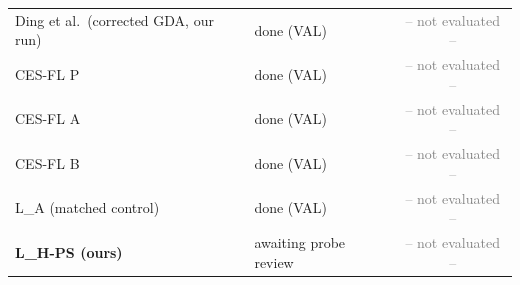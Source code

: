 \documentclass[9pt]{extarticle}
\begin{document}
\begin{table}[h]
{\begin{tabular}{ll|ccccc|ccccc|ccccc|ccccc}
Ding et al.\ (corrected GDA, our run) & done (VAL) & \multicolumn{20}{c}{\textcolor{gray}{-- not evaluated --}} \\
CES-FL P & done (VAL) & \multicolumn{20}{c}{\textcolor{gray}{-- not evaluated --}} \\
CES-FL A & done (VAL) & \multicolumn{20}{c}{\textcolor{gray}{-- not evaluated --}} \\
CES-FL B & done (VAL) & \multicolumn{20}{c}{\textcolor{gray}{-- not evaluated --}} \\
L\_A (matched control) & done (VAL) & \multicolumn{20}{c}{\textcolor{gray}{-- not evaluated --}} \\
\textbf{L\_H-PS (ours)} & awaiting probe review & \multicolumn{20}{c}{\textcolor{gray}{-- not evaluated --}} \\
\bottomrule\end{tabular}}\end{table}
\end{document}

